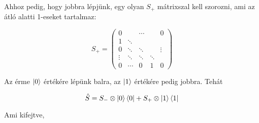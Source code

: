 Ahhoz pedig, hogy jobbra lépjünk, egy olyan $S_{+}$ mátrixszal kell szorozni,
ami az átló alatti 1-eseket tartalmaz:

\begin{center}
  \[ S_{+} =
    \left(
    \begin{array}{ccccc}

        0      &        & \cdots &        & 0      \\
        1      & \ddots &        &        &        \\
        0      & \ddots & \ddots &        & \vdots \\
        \vdots & \ddots & \ddots & \ddots &        \\
        0      & \cdots & 0      & 1      & 0
      \end{array}
    \right)
  \]
\end{center}

Az érme $\ket{0}$ értékére lépünk balra, az $\ket{1}$ értékére pedig jobbra.
Tehát

\begin{center}
  \[ \hat{S} = S_{-}\otimes\ket{0}\bra{0} + S_{+}\otimes\ket{1}\bra{1}
  \]
\end{center}

Ami kifejtve,

